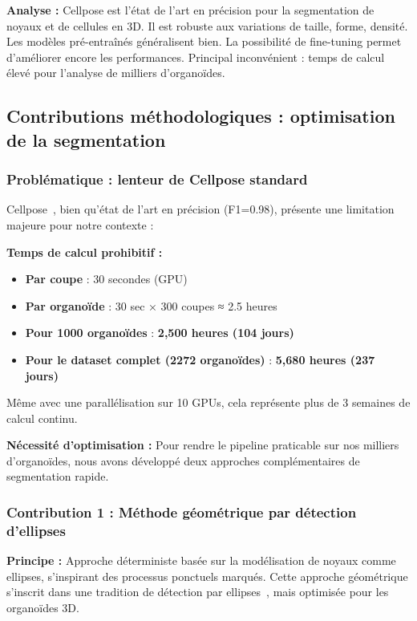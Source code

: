 \textbf{Analyse :}
Cellpose est l'état de l'art en précision pour la segmentation de noyaux et de cellules en 3D. Il est robuste aux variations de taille, forme, densité. Les modèles pré-entraînés généralisent bien. La possibilité de fine-tuning permet d'améliorer encore les performances. Principal inconvénient : temps de calcul élevé pour l'analyse de milliers d'organoïdes.

\subsection{Contributions méthodologiques : optimisation de la segmentation}

\subsubsection{Problématique : lenteur de Cellpose standard}

Cellpose~\cite{Stringer2021}, bien qu'état de l'art en précision (F1=0.98), présente une limitation majeure pour notre contexte :

\textbf{Temps de calcul prohibitif :}
\begin{itemize}
    \item \textbf{Par coupe} : 30 secondes (GPU)
    \item \textbf{Par organoïde} : 30 sec × 300 coupes ≈ 2.5 heures
    \item \textbf{Pour 1000 organoïdes} : \textbf{2,500 heures (104 jours)}
    \item \textbf{Pour le dataset complet (2272 organoïdes)} : \textbf{5,680 heures (237 jours)}
\end{itemize}

Même avec une parallélisation sur 10 GPUs, cela représente plus de 3 semaines de calcul continu.

\textbf{Nécessité d'optimisation :}
Pour rendre le pipeline praticable sur nos milliers d'organoïdes, nous avons développé deux approches complémentaires de segmentation rapide.

\subsubsection{Contribution 1 : Méthode géométrique par détection d'ellipses}

\textbf{Principe :}
Approche déterministe basée sur la modélisation de noyaux comme ellipses, s'inspirant des processus ponctuels marqués. Cette approche géométrique s'inscrit dans une tradition de détection par ellipses~\cite{Kirsten2023}, mais optimisée pour les organoïdes 3D.

